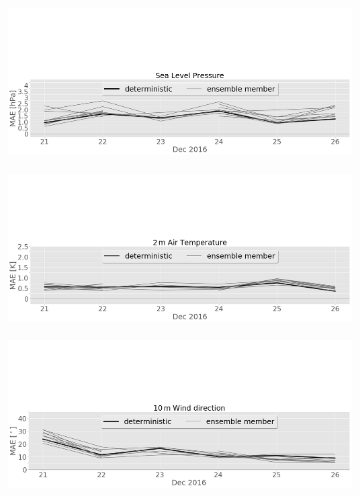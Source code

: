 \begin{figure}[H]%
	\centering
	\begin{subfigure}[b]{\textwidth}
		\includegraphics[trim={0cm 0cm 0cm 9.5cm},clip,width=\textwidth]{./fig_sfc_pressure/MAE_20161220_26_00}
		\caption{}\label{fig:MAE:pres}
	\end{subfigure}
	\begin{subfigure}[b]{\textwidth}
		\includegraphics[trim={0cm 0cm 0cm 9.5cm},clip,width=\textwidth]{./fig_sfc_temp/MAE_20161220_26_00}
		\caption{}\label{fig:MAE:temp}
	\end{subfigure}
	\begin{subfigure}[b]{\textwidth}
		\includegraphics[trim={0cm 0cm 0cm 9.5cm},clip,width=\textwidth]{./fig_sfc_wd/MAE_20161220_26_00}
		\caption{}\label{fig:MAE:wd}
	\end{subfigure}

\end{figure}
